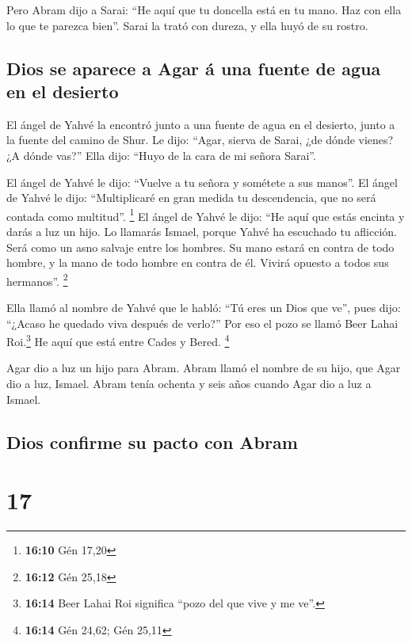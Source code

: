  Pero Abram dijo a Sarai: ``He aquí que tu doncella está
en tu mano. Haz con ella lo que te parezca bien''. Sarai la trató con
dureza, y ella huyó de su rostro.

\hypertarget{dios-se-aparece-a-agar-uxe1-una-fuente-de-agua-en-el-desierto}{%
\subsection{Dios se aparece a Agar á una fuente de agua en el
desierto}\label{dios-se-aparece-a-agar-uxe1-una-fuente-de-agua-en-el-desierto}}

 El ángel de Yahvé la encontró junto a una fuente de agua
en el desierto, junto a la fuente del camino de Shur.  Le
dijo: ``Agar, sierva de Sarai, ¿de dónde vienes? ¿A dónde vas?'' Ella
dijo: ``Huyo de la cara de mi señora Sarai''.

 El ángel de Yahvé le dijo: ``Vuelve a tu señora y
sométete a sus manos''.  El ángel de Yahvé le dijo:
``Multiplicaré en gran medida tu descendencia, que no será contada como
multitud''. \footnote{\textbf{16:10} Gén 17,20}  El ángel
de Yahvé le dijo: ``He aquí que estás encinta y darás a luz un hijo. Lo
llamarás Ismael, porque Yahvé ha escuchado tu aflicción. 
Será como un asno salvaje entre los hombres. Su mano estará en contra de
todo hombre, y la mano de todo hombre en contra de él. Vivirá opuesto a
todos sus hermanos''. \footnote{\textbf{16:12} Gén 25,18}

 Ella llamó al nombre de Yahvé que le habló: ``Tú eres un
Dios que ve'', pues dijo: ``¿Acaso he quedado viva después de verlo?''
 Por eso el pozo se llamó Beer Lahai Roi.\footnote{\textbf{16:14}
  Beer Lahai Roi significa ``pozo del que vive y me ve''.} He aquí que
está entre Cades y Bered. \footnote{\textbf{16:14} Gén 24,62; Gén 25,11}

 Agar dio a luz un hijo para Abram. Abram llamó el nombre
de su hijo, que Agar dio a luz, Ismael.  Abram tenía
ochenta y seis años cuando Agar dio a luz a Ismael.

\hypertarget{dios-confirme-su-pacto-con-abram}{%
\subsection{Dios confirme su pacto con
Abram}\label{dios-confirme-su-pacto-con-abram}}

\hypertarget{section-16}{%
\section{17}\label{section-16}}

